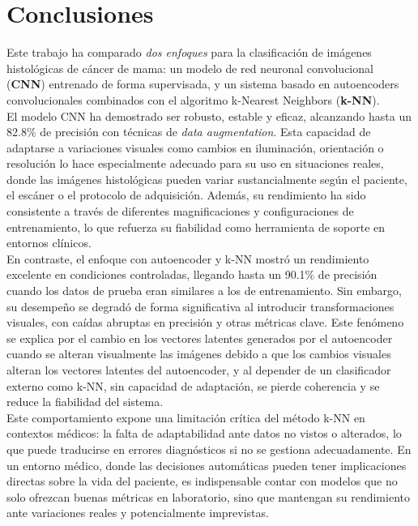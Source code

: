 \documentclass[12pt]{article} %
\begin{document}
\newpage
\section{Conclusiones}
Este trabajo ha comparado \textit{dos enfoques} para la clasificación de imágenes histológicas de cáncer de mama: un modelo de red neuronal convolucional (\textbf{CNN}) entrenado de forma supervisada, y un sistema basado en autoencoders convolucionales combinados con el algoritmo k-Nearest Neighbors (\textbf{k-NN}).\\

El modelo CNN ha demostrado ser robusto, estable y eficaz, alcanzando hasta un 82.8\% de precisión con técnicas de \textit{data augmentation}. Esta capacidad de adaptarse a variaciones visuales como cambios en iluminación, orientación o resolución lo hace especialmente adecuado para su uso en situaciones reales, donde las imágenes histológicas pueden variar sustancialmente según el paciente, el escáner o el protocolo de adquisición. Además, su rendimiento ha sido consistente a través de diferentes magnificaciones y configuraciones de entrenamiento, lo que refuerza su fiabilidad como herramienta de soporte en entornos clínicos.\\

En contraste, el enfoque con autoencoder y k-NN mostró un rendimiento excelente en condiciones controladas, llegando hasta un 90.1\% de precisión cuando los datos de prueba eran similares a los de entrenamiento. Sin embargo, su desempeño se degradó de forma significativa al introducir transformaciones visuales, con caídas abruptas en precisión y otras métricas clave. Este fenómeno se explica por el cambio en los vectores latentes generados por el autoencoder cuando se alteran visualmente las imágenes debido a que los cambios visuales alteran los vectores latentes del autoencoder, y al depender de un clasificador externo como k-NN, sin capacidad de adaptación, se pierde coherencia y se reduce la fiabilidad del sistema.\\

Este comportamiento expone una limitación crítica del método k-NN en contextos médicos: la falta de adaptabilidad ante datos no vistos o alterados, lo que puede traducirse en errores diagnósticos si no se gestiona adecuadamente. En un entorno médico, donde las decisiones automáticas pueden tener implicaciones directas sobre la vida del paciente, es indispensable contar con modelos que no solo ofrezcan buenas métricas en laboratorio, sino que mantengan su rendimiento ante variaciones reales y potencialmente imprevistas.\\
\end{document}
